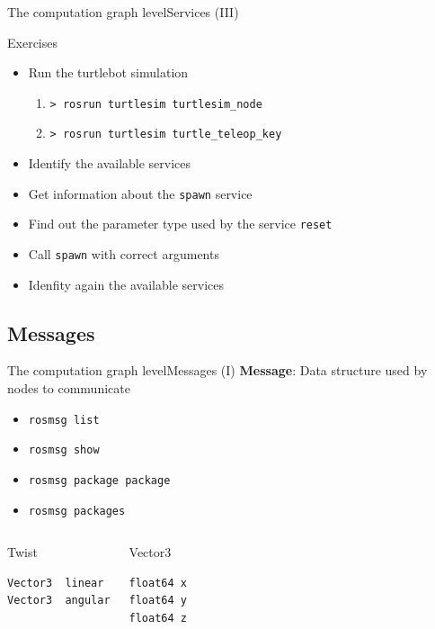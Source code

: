 \documentclass[10pt,compress]{beamer} %
\begin{document}
\begin{frame}{The computation graph level}{Services (III)}
	\begin{block}{Exercises}
  	\begin{itemize}
		\item Run the turtlebot simulation
			\begin{enumerate}
			\item \texttt{> rosrun turtlesim turtlesim\_node}
			\item \texttt{> rosrun turtlesim turtle\_teleop\_key}
			\end{enumerate}
		\item Identify the available services
		\item Get information about the \texttt{spawn} service
		\item Find out the parameter type used by the service \texttt{reset}
		\item Call \texttt{spawn} with correct arguments
		\item Idenfity again the available services
	\end{itemize}
	\end{block}
\end{frame}

\subsection{Messages}
\begin{frame}[fragile]{The computation graph level}{Messages (I)}
	\textbf{Message}: Data structure used by nodes to communicate
  	\begin{itemize}
		\item \texttt{rosmsg list}
		\item \texttt{rosmsg show}
		\item \texttt{rosmsg package package}
		\item \texttt{rosmsg packages}
	\end{itemize}

    \begin{columns}
	\begin{exampleblock}{Twist}
	\begin{verbatim}
Vector3  linear
Vector3  angular
\end{verbatim}
	\end{exampleblock}
	\begin{exampleblock}{Vector3}
	\begin{verbatim}
float64 x
float64 y
float64 z
\end{verbatim}
	\end{exampleblock}
	\end{columns}
\end{frame}
\end{document}
